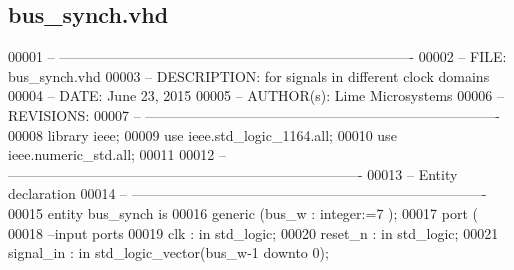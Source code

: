 \subsection{bus\+\_\+synch.\+vhd}
\label{bus__synch_8vhd_source}

\begin{DoxyCode}
00001 \textcolor{keyword}{-- ---------------------------------------------------------------------------- }
00002 \textcolor{keyword}{-- FILE:    bus\_synch.vhd}
00003 \textcolor{keyword}{-- DESCRIPTION: for signals in different clock domains}
00004 \textcolor{keyword}{-- DATE:    June 23, 2015}
00005 \textcolor{keyword}{-- AUTHOR(s):   Lime Microsystems}
00006 \textcolor{keyword}{-- REVISIONS:}
00007 \textcolor{keyword}{-- ---------------------------------------------------------------------------- }
00008 \textcolor{vhdlkeyword}{library }\textcolor{keywordflow}{ieee};
00009 \textcolor{vhdlkeyword}{use }ieee.std\_logic\_1164.\textcolor{keywordflow}{all};
00010 \textcolor{vhdlkeyword}{use }ieee.numeric\_std.\textcolor{keywordflow}{all};
00011 
00012 \textcolor{keyword}{-- ----------------------------------------------------------------------------}
00013 \textcolor{keyword}{-- Entity declaration}
00014 \textcolor{keyword}{-- ----------------------------------------------------------------------------}
00015 \textcolor{keywordflow}{entity }bus_synch \textcolor{keywordflow}{is}
00016   \textcolor{keywordflow}{generic} \textcolor{vhdlchar}{(}\textcolor{vhdlchar}{bus_w} \textcolor{vhdlchar}{:} \textcolor{comment}{integer}\textcolor{vhdlchar}{:=}\textcolor{vhdllogic}{}\textcolor{vhdllogic}{7} \textcolor{vhdlchar}{)};
00017   \textcolor{keywordflow}{port} \textcolor{vhdlchar}{(}
00018 \textcolor{keyword}{        --input ports }
00019         \textcolor{vhdlchar}{clk}             \textcolor{vhdlchar}{:} \textcolor{keywordflow}{in} \textcolor{comment}{std\_logic};
00020         \textcolor{vhdlchar}{reset_n}         \textcolor{vhdlchar}{:} \textcolor{keywordflow}{in} \textcolor{comment}{std\_logic};
00021           \textcolor{keywordflow}{signal}\textcolor{vhdlchar}{\_in}         \textcolor{vhdlchar}{:} \textcolor{keywordflow}{in} \textcolor{comment}{std\_logic\_vector}\textcolor{vhdlchar}{(}\textcolor{vhdlchar}{bus_w}\textcolor{vhdlchar}{-}\textcolor{vhdllogic}{}\textcolor{vhdllogic}{1} \textcolor{keywordflow}{downto} \textcolor{vhdllogic}{}\textcolor{vhdllogic}{0}\textcolor{vhdlchar}{)};

\end{DoxyCode}
